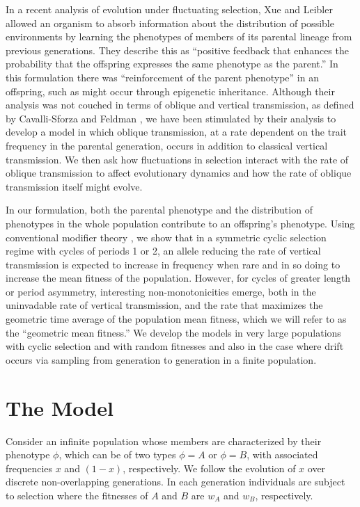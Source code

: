 \documentclass[9pt,twocolumn,twoside,lineno]{pnas-new}
\begin{document}
In a recent analysis of evolution under fluctuating selection, Xue and Leibler \cite{xue2016evolutionary} allowed an organism to absorb information about the distribution of possible environments by learning the phenotypes of members of its parental lineage from previous generations. They describe this as ``positive feedback that enhances the probability that the offspring expresses the same phenotype as the parent.'' In this formulation there was ``reinforcement of the parent phenotype'' in an offspring, such as might occur through epigenetic inheritance. Although their analysis was not couched in terms of oblique and vertical transmission, as defined by Cavalli-Sforza and Feldman \cite{cavalli1981cultural}, we have been stimulated by their analysis to develop a model in which oblique transmission, at a rate dependent on the trait frequency in the parental generation, occurs in addition to classical vertical transmission. We then ask how fluctuations in selection interact with the rate of oblique transmission to affect evolutionary dynamics and how the rate of oblique transmission itself might evolve. 

In our formulation, both the parental phenotype and the distribution of phenotypes in the whole population contribute to an offspring's phenotype. Using conventional modifier theory \cite{feldman1986evolutionary}, we show that in a symmetric cyclic selection regime with cycles of periods 1 or 2, an allele reducing the rate of vertical transmission is expected to increase in frequency when rare and in so doing to increase the mean fitness of the population. However, for cycles of greater length or period asymmetry, interesting non-monotonicities emerge, both in the uninvadable rate of vertical transmission, and the rate that maximizes the geometric time average of the population mean fitness, which we will refer to as the ``geometric mean fitness.'' We develop the models in very large populations with cyclic selection and with random fitnesses and also in the case where drift occurs via sampling from generation to generation in a finite population.

\section{The Model}

Consider an infinite population whose members are characterized by their phenotype $\phi$, which can be of two types $\phi=A$ or $\phi=B$, with associated frequencies $x$ and $(1-x)$, respectively. We follow the evolution of $x$ over discrete non-overlapping generations. In each generation individuals are subject to  selection where the fitnesses of $A$ and $B$ are $w_A$ and $w_B$, respectively.
\end{document}
